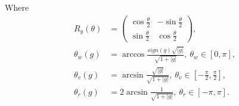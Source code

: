 Where
\begin{equation*}
  \begin{split}
    R_y(\theta) & = \begin{pmatrix}
      \cos{\frac{\theta}{2}} & -\sin{\frac{\theta}{2}} \\
      \sin{\frac{\theta}{2}} & \cos{\frac{\theta}{2}} 
    \end{pmatrix}, \\
    \theta_w(g) & = \arccos{\frac{sign(g)\sqrt{|g|}}{\sqrt{1+|g|}}},\ \theta_w \in [0, \pi], \\
    \theta_v(g) & = \arcsin{\frac{\sqrt{|g|}}{\sqrt{1+|g|}}},\ \theta_v \in [-\frac{\pi}{2}, \frac{\pi}{2}], \\
    \theta_r(g) & = 2\arcsin{\frac{1}{\sqrt{1+|g|}}},\ \theta_r \in [-\pi, \pi].
  \end{split}
\end{equation*}

